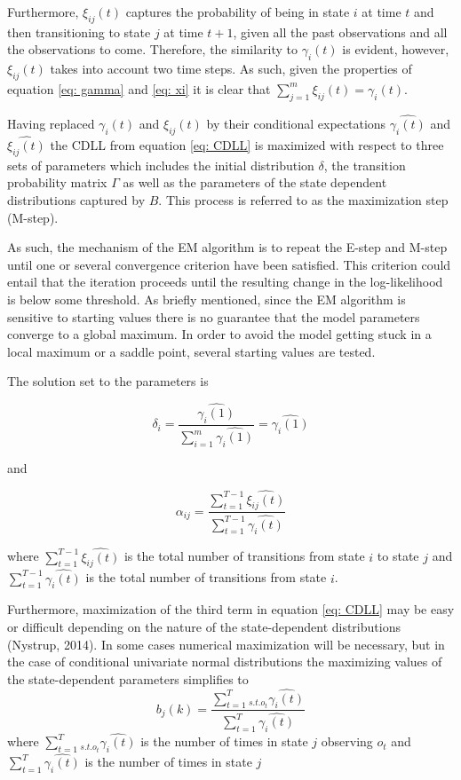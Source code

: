 Furthermore, $\xi_{ij}(t)$ captures the probability of being in state $i$ at time $t$ and then transitioning to state $j$ at time $t+1$, given all the past observations and all the observations to come. Therefore, the similarity to $\gamma_i(t)$ is evident, however, $\xi_{ij}(t)$ takes into account two time steps. As such, given the properties of equation \ref{eq: gamma} and \ref{eq: xi} it is clear that $\sum_{j=1}^m \xi_{ij}(t) = \gamma_i(t)$. 

Having replaced $\gamma_i(t)$ and $\xi_{ij}(t)$ by their conditional expectations $\hat{\gamma_i(t)}$ and $\hat{\xi_{ij}(t)}$ the CDLL from equation \ref{eq: CDLL} is maximized with respect to three sets of parameters which includes the initial distribution $\delta$, the transition probability matrix $\Gamma$ as well as the parameters of the state dependent distributions captured by $B$. This process is referred to as the maximization step (M-step). 

As such, the mechanism of the EM algorithm is to repeat the E-step and M-step until one or several convergence criterion have been satisfied. This criterion could entail that the iteration proceeds until the resulting change in the log-likelihood is below some threshold. As briefly mentioned, since the EM algorithm is sensitive to starting values there is no guarantee that the model parameters converge to a global maximum. In order to avoid the model getting stuck in a local maximum or a saddle point, several starting values are tested. 

The solution set to the parameters is 

\begin{equation}
    \delta_i = \frac{\hat{\gamma_i(1)}}{\sum_{i=1}^m\hat{\gamma_i(1)}} = \hat{\gamma_i(1)}
\end{equation}

and

\begin{equation}
    \alpha_{ij} = \frac{\sum_{t=1}^{T-1}\hat{\xi_{ij}(t)}}{\sum_{t=1}^{T-1}\hat{\gamma_i(t)}}
\end{equation}

where $\sum_{t=1}^{T-1}\hat{\xi_{ij}(t)}$ is the total number of transitions from state $i$ to state $j$ and $\sum_{t=1}^{T-1}\hat{\gamma_i(t)}$ is the total number of transitions from state $i$.

Furthermore, maximization of the third term in equation \ref{eq: CDLL} may be easy or difficult depending on the nature of the state-dependent distributions (Nystrup, 2014). In some cases numerical maximization will be necessary, but in the case of conditional univariate normal
distributions the maximizing values of the state-dependent parameters simplifies to
\begin{equation}
    b_j(k) = \frac{\sum_{t=1}^T_{s.t.o_{t}}\hat{\gamma_i(t)}}{\sum_{t=1}^T\hat{\gamma_i(t)}}    
\end{equation}
where $\sum_{t=1}^T_{s.t.o_t}\hat{\gamma_i(t)}$ is the number of times in state $j$ observing $o_t$ and $\sum_{t=1}^T\hat{\gamma_i(t)}$ is the number of times in state $j$


